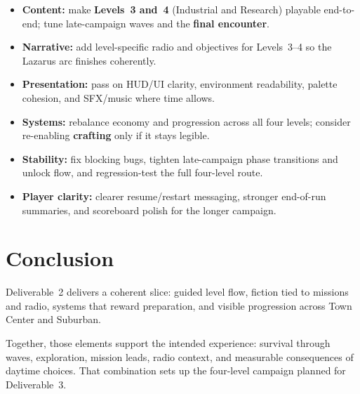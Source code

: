 \documentclass[11pt]{article}
\begin{document}
\begin{itemize}
    \item \textbf{Content:} make \textbf{Levels~3 and~4} (Industrial and Research) playable end-to-end; tune late-campaign waves and the \textbf{final encounter}.
    \item \textbf{Narrative:} add level-specific radio and objectives for Levels~3--4 so the Lazarus arc finishes coherently.
    \item \textbf{Presentation:} pass on HUD/UI clarity, environment readability, palette cohesion, and SFX/music where time allows.
    \item \textbf{Systems:} rebalance economy and progression across all four levels; consider re-enabling \textbf{crafting} only if it stays legible.
    \item \textbf{Stability:} fix blocking bugs, tighten late-campaign phase transitions and unlock flow, and regression-test the full four-level route.
    \item \textbf{Player clarity:} clearer resume/restart messaging, stronger end-of-run summaries, and scoreboard polish for the longer campaign.
\end{itemize}

\section{Conclusion}\label{sec:conclusion}

Deliverable~2 delivers a coherent slice: guided level flow, fiction tied to missions and radio, systems that reward preparation, and visible progression across Town Center and Suburban.

Together, those elements support the intended experience: survival through waves, exploration, mission leads, radio context, and measurable consequences of daytime choices. That combination sets up the four-level campaign planned for Deliverable~3.
\end{document}
